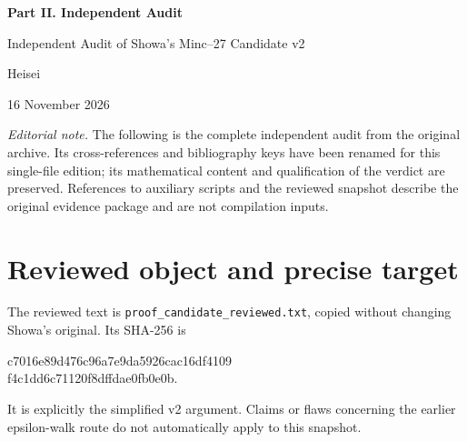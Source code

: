 \documentclass[11pt,a4paper]{article}
\begin{document}
\clearpage
{}
{}
\begin{center}
{\Large\bfseries Part II. Independent Audit}\par\medskip
{\large Independent Audit of Showa's Minc--27 Candidate v2}\par\smallskip
Heisei\par
16 November 2026
\end{center}
\medskip
\noindent\textit{Editorial note.} The following is the complete independent audit
from the original archive. Its cross-references and bibliography keys have been
renamed for this single-file edition; its mathematical content and qualification
of the verdict are preserved. References to auxiliary scripts and the reviewed
snapshot describe the original evidence package and are not compilation inputs.
\medskip
\setcounter{section}{0}
\setcounter{equation}{0}
\renewcommand{\thesection}{A.\arabic{section}}
\renewcommand{\theequation}{A.\arabic{equation}}
\renewcommand{\theHsection}{audit.\arabic{section}}
\renewcommand{\theHequation}{audit.\arabic{equation}}
\renewcommand{\refname}{References for the Independent Audit}
\begin{abstract}
This is an adversarial audit of a fixed snapshot, not a new research submission or an assertion of priority. No error was found in the v2 derivation of $V(p)=\Omega(p^{4/3})$ from the published dense-complement permanent expansion. The relevant source allows growing row deficit, and the original Godsil--McKay paper explicitly makes its section-6 error constants independent of that deficit. We give exact elementary derivations, a uniform threshold calculation, and fresh exhaustive finite diagnostics. These findings address mathematical completeness of the candidate, not G5 originality, exhaustive literature priority, formal proof certification, or independent rederivation of the imported analytic theorem.
\end{abstract}

\section{Reviewed object and precise target}
The reviewed text is \texttt{proof\_candidate\_reviewed.txt}, copied without changing Showa's original. Its SHA-256 is
\begin{center}\small\ttfamily
c7016e89d476c96a7e9da5926cac16df4109\\f4c1dd6c71120f8dffdae0fb0e0b.
\end{center}
It is explicitly the simplified v2 argument. Claims or flaws concerning the earlier epsilon-walk route do not automatically apply to this snapshot.
\end{document}

